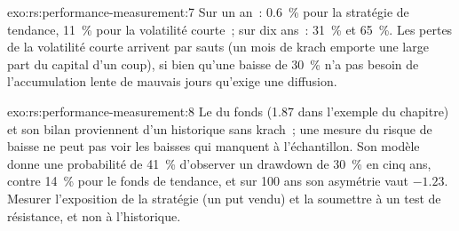 \begin{solution}{exo:rs:performance-measurement:7}
Sur un an~: 0.6~\% pour la stratégie de tendance, 11~\% pour la volatilité courte~; sur dix ans~: 31~\% et 65~\%. Les pertes de la volatilité courte arrivent par sauts
(un mois de krach emporte une large part du capital d'un coup), si bien qu'une baisse de 30~\% n'a pas besoin de l'accumulation lente de mauvais jours qu'exige une diffusion.
\end{solution}

\begin{solution}{exo:rs:performance-measurement:8}
Le  du fonds (1.87 dans l'exemple du chapitre) et son bilan proviennent d'un historique sans krach~; une mesure du risque de baisse ne peut pas voir les baisses
qui manquent à l'échantillon. Son modèle donne une probabilité de 41~\% d'observer un drawdown de 30~\% en cinq ans, contre 14~\% pour le fonds de tendance, et sur 100 ans son asymétrie vaut $-1.23$.
Mesurer l'exposition de la stratégie (un put vendu) et la soumettre à un test de résistance, et non à l'historique.
\end{solution}

